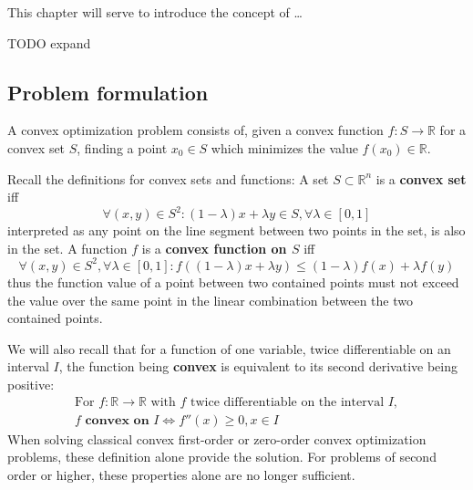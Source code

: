 \documentclass[../convex_optimization.tex]{subfiles}
\begin{document}
This chapter will serve to introduce the concept of \ldots

TODO expand

\subsection{Problem formulation}
A convex optimization problem consists of, given a convex function
$f: S \to \mathbb R$ for a convex set $S$, finding
a point $x_0 \in S$ which minimizes the value $f(x_0) \in \mathbb R$.

Recall the definitions for convex sets and functions:
A set $S \subset \mathbb R^n$ is a \textbf{convex set} iff
\begin{equation}
    \forall (x, y) \in S^2: (1-\lambda)x + \lambda y \in S,
    \forall \lambda \in [0, 1]
    \label{convex_set}
\end{equation}
interpreted as any point on the line segment between two points in the set,
is also in the set.
A function $f$ is a \textbf{convex function on $S$} iff
\begin{equation}
    \forall (x, y) \in S^2, \forall \lambda \in [0, 1]:
    f((1-\lambda)x + \lambda y) \leq (1-\lambda)f(x) + \lambda f(y)
    \label{convex_function}
\end{equation}
thus the function value of a point between two contained points must
not exceed the value over the same point in the linear combination between the two contained points.

We will also recall that for a function of one variable,
twice differentiable on an interval $I$,
the function being \textbf{convex} is equivalent to its second derivative
being positive:
\begin{equation} \label{convex_corollary}
\begin{gathered}
    \text{For } f: \mathbb R \to \mathbb R
    \text{ with $f$ twice differentiable on the interval $I$}, \\
    f \textbf{ convex on $I$} \iff f''(x) \geq 0, x \in I
\end{gathered}
\end{equation}
When solving classical convex first-order or zero-order convex
optimization problems, these definition alone provide the solution.
For problems of second order or higher, these properties alone are
no longer sufficient.
\end{document}
